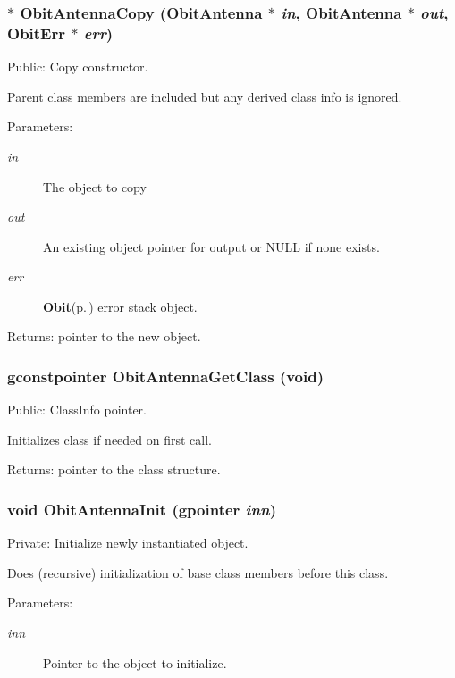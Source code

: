 \subsubsection{$\ast$ Obit\-Antenna\-Copy ({\bf Obit\-Antenna} $\ast$ {\em in}, {\bf Obit\-Antenna} $\ast$ {\em out}, {\bf Obit\-Err} $\ast$ {\em err})}\label{ObitAntenna_8c_a8}


Public: Copy constructor. 

Parent class members are included but any derived class info is ignored. \begin{Desc}
\item[Parameters:]
\begin{description}
\item[{\em in}]The object to copy \item[{\em out}]An existing object pointer for output or NULL if none exists. \item[{\em err}]{\bf Obit}{\rm (p.\,\pageref{structObit})} error stack object. \end{description}
\end{Desc}
\begin{Desc}
\item[Returns:]pointer to the new object. \end{Desc}
\subsubsection{\setlength{\rightskip}{0pt plus 5cm}gconstpointer Obit\-Antenna\-Get\-Class (void)}\label{ObitAntenna_8c_a7}


Public: Class\-Info pointer. 

Initializes class if needed on first call. \begin{Desc}
\item[Returns:]pointer to the class structure. \end{Desc}
\subsubsection{\setlength{\rightskip}{0pt plus 5cm}void Obit\-Antenna\-Init (gpointer {\em inn})}\label{ObitAntenna_8c_a3}


Private: Initialize newly instantiated object. 

Does (recursive) initialization of base class members before this class. \begin{Desc}
\item[Parameters:]
\begin{description}
\item[{\em inn}]Pointer to the object to initialize. \end{description}
\end{Desc}
